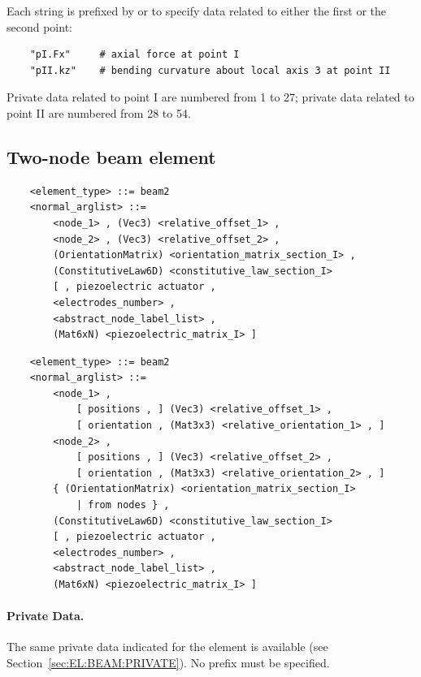 Each string is prefixed by  or 
to specify data related to either the first or the second point:
\begin{verbatim}
    "pI.Fx"     # axial force at point I
    "pII.kz"    # bending curvature about local axis 3 at point II
\end{verbatim}
Private data related to point I are numbered from 1 to 27;
private data related to point II are numbered from 28 to 54.








\subsection{Two-node beam element}
\begin{verbatim}
    <element_type> ::= beam2
    <normal_arglist> ::=
        <node_1> , (Vec3) <relative_offset_1> ,
        <node_2> , (Vec3) <relative_offset_2> ,
        (OrientationMatrix) <orientation_matrix_section_I> ,
        (ConstitutiveLaw6D) <constitutive_law_section_I>
        [ , piezoelectric actuator , 
        <electrodes_number> ,
        <abstract_node_label_list> ,
        (Mat6xN) <piezoelectric_matrix_I> ]
\end{verbatim}
\begin{verbatim}
    <element_type> ::= beam2
    <normal_arglist> ::=
        <node_1> ,
            [ positions , ] (Vec3) <relative_offset_1> ,
            [ orientation , (Mat3x3) <relative_orientation_1> , ]
        <node_2> ,
            [ positions , ] (Vec3) <relative_offset_2> ,
            [ orientation , (Mat3x3) <relative_orientation_2> , ]
        { (OrientationMatrix) <orientation_matrix_section_I>
            | from nodes } ,
        (ConstitutiveLaw6D) <constitutive_law_section_I>
        [ , piezoelectric actuator , 
        <electrodes_number> ,
        <abstract_node_label_list> ,
        (Mat6xN) <piezoelectric_matrix_I> ]
\end{verbatim}

\paragraph{Private Data.}
The same private data indicated for the  element is available
(see Section~\ref{sec:EL:BEAM:PRIVATE}).
No prefix must be specified.


